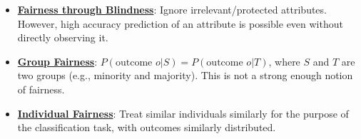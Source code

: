\documentclass{article}%
\begin{document}
\begin{itemize}[leftmargin=*]%
\item \href{https://purdue.brightspace.com/d2l/common/assets/pdfjs-d2l-dist/1.0.14-legacy/web/viewer.html?file=\%2Fcontent\%2Fenforced\%2F1095465-WL.202510.CS24200.LE1\%2F25-ethics.pdf\%3Fou\%3D1095465\&lang=en-us\&container=d2l-fileviewer-rendered-pdf\&fullscreen=d2l-fileviewer-rendered-pdf-dialog\&height=667#page=23}{\textbf{Fairness through Blindness}}: Ignore irrelevant/protected attributes. However, high accuracy prediction of an attribute is possible even without directly observing it.%
\item \href{https://purdue.brightspace.com/d2l/common/assets/pdfjs-d2l-dist/1.0.14-legacy/web/viewer.html?file=\%2Fcontent\%2Fenforced\%2F1095465-WL.202510.CS24200.LE1\%2F25-ethics.pdf\%3Fou\%3D1095465\&lang=en-us\&container=d2l-fileviewer-rendered-pdf\&fullscreen=d2l-fileviewer-rendered-pdf-dialog\&height=667#page=24}{\textbf{Group Fairness}}: $P(\text{outcome } o | S) = P(\text{outcome } o | T)$, where $S$ and $T$ are two groups (e.g., minority and majority). This is not a strong enough notion of fairness.%
\item \href{https://purdue.brightspace.com/d2l/common/assets/pdfjs-d2l-dist/1.0.14-legacy/web/viewer.html?file=\%2Fcontent\%2Fenforced\%2F1095465-WL.202510.CS24200.LE1\%2F25-ethics.pdf\%3Fou\%3D1095465\&lang=en-us\&container=d2l-fileviewer-rendered-pdf\&fullscreen=d2l-fileviewer-rendered-pdf-dialog\&height=667#page=25}{\textbf{Individual Fairness}}: Treat similar individuals similarly for the purpose of the classification task, with outcomes similarly distributed.%
\end{itemize}

%
\end{document}
